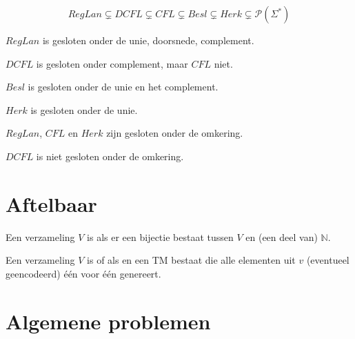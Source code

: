 \documentclass[main.tex]{subfiles}
\begin{document}
\begin{st}
  \[ RegLan \subsetneq DCFL \subsetneq CFL \subsetneq Besl \subsetneq Herk \subsetneq \mathcal{P}(\Sigma^{*}) \]
\end{st}

\begin{st}
  $RegLan$ is gesloten onder de unie, doorsnede, complement.
\end{st}

\begin{st}
  $DCFL$ is gesloten onder complement, maar $CFL$ niet. 
\end{st}

\begin{st}
  $Besl$ is gesloten onder de unie en het complement.
\end{st}

\begin{st}
  $Herk$ is gesloten onder de unie.
\end{st}

\begin{st}
  $RegLan$, $CFL$ en $Herk$ zijn gesloten onder de omkering.
\end{st}

\begin{st}
  $DCFL$ is niet gesloten onder de omkering.
\end{st}

\section{Aftelbaar}
\label{sec:aftelbaar}

\begin{de}
  Een verzameling $V$ is  als er een bijectie bestaat tussen $V$ en (een deel van) $\mathbb{N}$.
\end{de}

\begin{de}
  Een verzameling $V$ is  of  als en een TM bestaat die alle elementen uit $v$ (eventueel geencodeerd) \'e\'en voor \'e\'en genereert.
\end{de}

\section{Algemene problemen}
\label{sec:algemene-problemen}
\end{document}
